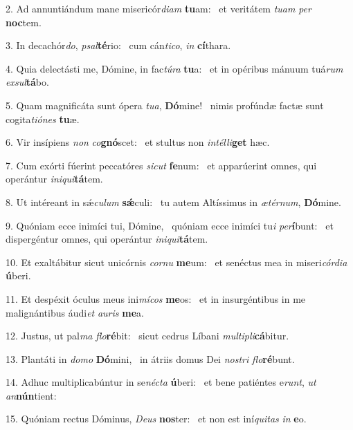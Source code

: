 2. Ad annuntiándum mane misericór\textit{di}\textit{am} \textbf{tu}am: \ast\  et veritátem \textit{tu}\textit{am} \textit{per} \textbf{noc}tem.\

3. In decachór\textit{do}, \textit{psal}\textbf{té}rio: \ast\  cum cán\textit{ti}\textit{co}, \textit{in} \textbf{cí}thara.\

4. Quia delectásti me, Dómine, in fac\textit{tú}\textit{ra} \textbf{tu}a: \ast\  et in opéribus mánuum tuá\textit{rum} \textit{ex}\textit{sul}\textbf{tá}bo.\

5. Quam magnificáta sunt ópera \textit{tu}\textit{a}, \textbf{Dó}mine! \ast\  nimis profúndæ factæ sunt cogita\textit{ti}\textit{ó}\textit{nes} \textbf{tu}æ.\

6. Vir insípiens \textit{non} \textit{co}\textbf{gnó}scet: \ast\  et stultus non \textit{in}\textit{tél}\textit{li}\textbf{get} hæc.\

7. Cum exórti fúerint peccatóres \textit{sic}\textit{ut} \textbf{fe}num: \ast\  et apparúerint omnes, qui operántur \textit{in}\textit{i}\textit{qui}\textbf{tá}tem.\

8. Ut intéreant in sǽ\textit{cu}\textit{lum} \textbf{sǽ}culi: \ast\  tu autem Altíssimus in \textit{æ}\textit{tér}\textit{num}, \textbf{Dó}mine.\

9. Quóniam ecce inimíci tui, Dómine, \dag\  quóniam ecce inimíci tu\textit{i} \textit{per}\textbf{í}bunt: \ast\  et dispergéntur omnes, qui operántur \textit{in}\textit{i}\textit{qui}\textbf{tá}tem.\

10. Et exaltábitur sicut unicórnis \textit{cor}\textit{nu} \textbf{me}um: \ast\  et senéctus mea in miseri\textit{cór}\textit{di}\textit{a} \textbf{ú}beri.\

11. Et despéxit óculus meus ini\textit{mí}\textit{cos} \textbf{me}os: \ast\  et in insurgéntibus in me malignántibus áudi\textit{et} \textit{au}\textit{ris} \textbf{me}a.\

12. Justus, ut pal\textit{ma} \textit{flo}\textbf{ré}bit: \ast\  sicut cedrus Líbani \textit{mul}\textit{ti}\textit{pli}\textbf{cá}bitur.\

13. Plantáti in \textit{do}\textit{mo} \textbf{Dó}mini, \ast\  in átriis domus Dei \textit{nos}\textit{tri} \textit{flo}\textbf{ré}bunt.\

14. Adhuc multiplicabúntur in se\textit{néc}\textit{ta} \textbf{ú}beri: \ast\  et bene patiéntes e\textit{runt}, \textit{ut} \textit{an}\textbf{nún}tient:\

15. Quóniam rectus Dóminus, \textit{De}\textit{us} \textbf{nos}ter: \ast\  et non est iní\textit{qui}\textit{tas} \textit{in} \textbf{e}o.\

